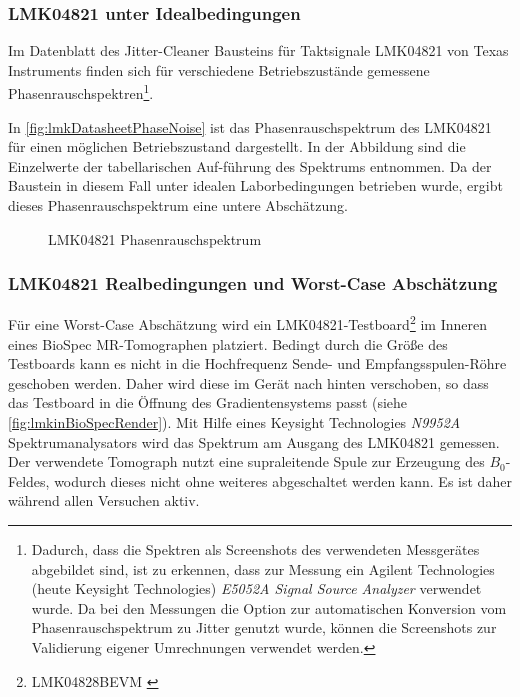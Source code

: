 \subsubsection{LMK04821 unter Idealbedingungen}
Im Datenblatt des Jitter-Cleaner Bausteins für Taktsignale LMK04821 von Texas Instruments \cite{lmkDatasheet} finden sich für verschiedene Betriebszustände gemessene Phasenrauschspektren\footnote{Dadurch, dass die Spektren als Screenshots des verwendeten Messgerätes abgebildet sind, ist zu erkennen, dass zur Messung ein Agilent Technologies (heute Keysight Technologies) \textit{E5052A Signal Source Analyzer} verwendet wurde. Da bei den Messungen die Option zur automatischen Konversion vom Phasenrauschspektrum zu Jitter genutzt wurde, können die Screenshots zur Validierung eigener Umrechnungen verwendet werden.}.  

In \autoref{fig:lmkDatasheetPhaseNoise} ist das Phasenrauschspektrum des LMK04821 für einen möglichen Betriebszustand dargestellt. In der Abbildung sind die Einzelwerte der tabellarischen Auf-führung des Spektrums entnommen. Da der Baustein in diesem Fall unter idealen Laborbedingungen betrieben wurde, ergibt dieses Phasenrauschspektrum eine untere Abschätzung.

\begin{figure}[H]
	\centering
	\caption[LMK08421 Phasenrauschspektrum]{LMK04821 Phasenrauschspektrum \cite[S.~24, Figure 2]{lmkDatasheet}}
	\label{fig:lmkDatasheetPhaseNoise}
\end{figure}


\subsubsection{LMK04821 Realbedingungen und Worst-Case Abschätzung}
Für eine Worst-Case Abschätzung wird ein LMK04821-Testboard\footnote{LMK04828BEVM \cite{lmkEvalboard}} im Inneren eines BioSpec MR-Tomographen platziert. Bedingt durch die Größe des Testboards kann es nicht in die Hochfrequenz Sende- und Empfangsspulen-Röhre geschoben werden. Daher wird diese im Gerät nach hinten verschoben, so dass das Testboard in die Öffnung des Gradientensystems passt (siehe \autoref{fig:lmkinBioSpecRender}). Mit Hilfe eines Keysight Technologies \textit{N9952A} Spektrumanalysators wird das Spektrum am Ausgang des LMK04821 gemessen. Der verwendete Tomograph nutzt eine supraleitende Spule zur Erzeugung des $B_0$-Feldes, wodurch dieses nicht ohne weiteres abgeschaltet werden kann. Es ist daher während allen Versuchen aktiv.

